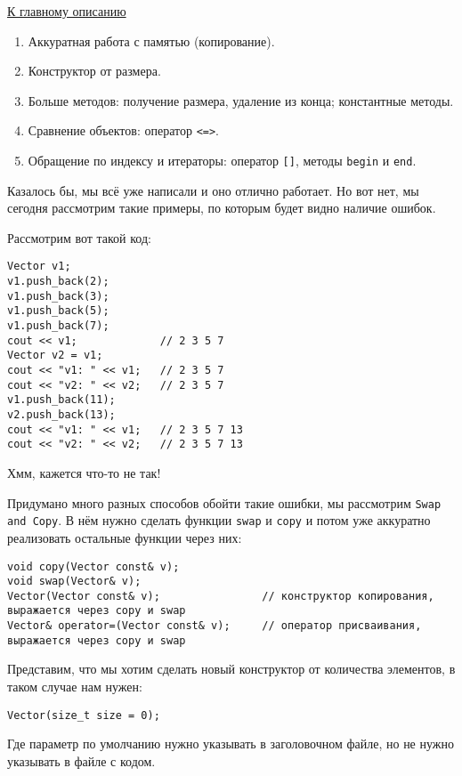 \label{md2tex3}
\hyperref[md2texREADME]{К главному описанию}


\begin{enumerate}
    \item Аккуратная работа с памятью (копирование).
    \item Конструктор от размера.
    \item Больше методов: получение размера, удаление из конца; константные методы.
    \item Сравнение объектов: оператор \texttt{<=>}.
    \item Обращение по индексу и итераторы: оператор \texttt{[]}, методы \texttt{begin} и \texttt{end}.
\end{enumerate}


Казалось бы, мы всё уже написали и оно отлично работает. Но вот нет, мы сегодня рассмотрим такие примеры, по которым будет видно наличие ошибок.

Рассмотрим вот такой код:
\begin{verbatim}
Vector v1;
v1.push_back(2);
v1.push_back(3);
v1.push_back(5);
v1.push_back(7);
cout << v1;             // 2 3 5 7
Vector v2 = v1;
cout << "v1: " << v1;   // 2 3 5 7
cout << "v2: " << v2;   // 2 3 5 7
v1.push_back(11);
v2.push_back(13);
cout << "v1: " << v1;   // 2 3 5 7 13
cout << "v2: " << v2;   // 2 3 5 7 13
\end{verbatim}
Хмм, кажется что-то не так! 

Придумано много разных способов обойти такие ошибки, мы рассмотрим \texttt{Swap and Copy}. В нём нужно сделать функции \texttt{swap} и \texttt{copy} и потом уже аккуратно реализовать остальные функции через них:
\begin{verbatim}
void copy(Vector const& v);
void swap(Vector& v);
Vector(Vector const& v);                // конструктор копирования, выражается через copy и swap
Vector& operator=(Vector const& v);     // оператор присваивания, выражается через copy и swap
\end{verbatim}


Представим, что мы хотим сделать новый конструктор от количества элементов, в таком случае нам нужен:
\begin{verbatim}
Vector(size_t size = 0);
\end{verbatim}
Где параметр по умолчанию нужно указывать в заголовочном файле, но не нужно указывать в файле с кодом.

